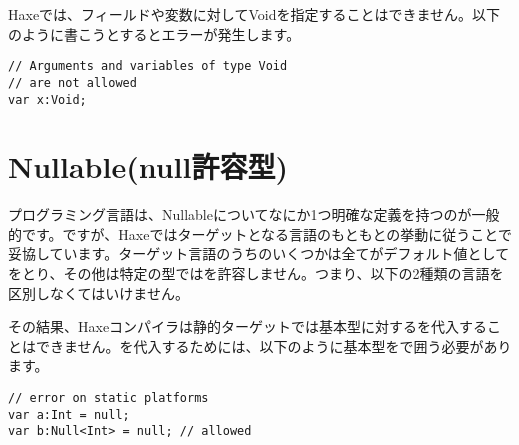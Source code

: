 Haxeでは、フィールドや変数に対してVoidを指定することはできません。以下のように書こうとするとエラーが発生します。

\begin{lstlisting}
// Arguments and variables of type Void
// are not allowed
var x:Void;
\end{lstlisting}



\section{Nullable(null許容型)}
\label{types-nullability}


プログラミング言語は、Nullableについてなにか1つ明確な定義を持つのが一般的です。ですが、Haxeではターゲットとなる言語のもともとの挙動に従うことで妥協しています。ターゲット言語のうちのいくつかは全てがデフォルト値としてをとり、その他は特定の型ではを許容しません。つまり、以下の2種類の言語を区別しなくてはいけません。



その結果、Haxeコンパイラは静的ターゲットでは基本型に対するを代入することはできません。を代入するためには、以下のように基本型をで囲う必要があります。

\begin{lstlisting}
// error on static platforms
var a:Int = null;
var b:Null<Int> = null; // allowed
\end{lstlisting}

